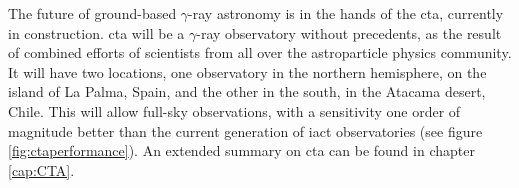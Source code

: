 \documentclass[main.tex]{subfiles}
\begin{document}
The future of ground-based $\gamma$-ray astronomy is in the hands of the \gls{cta},  currently in construction. \gls{cta} will be a $\gamma$-ray observatory without precedents, as the result of combined efforts of scientists from all over the astroparticle physics community. It will have two locations, one observatory in the northern hemisphere, on the island of La Palma, Spain, and the other in the south, in the Atacama desert, Chile. This will allow full-sky observations, with a sensitivity one order of magnitude better than the current generation of \gls{iact} observatories (see figure \ref{fig:ctaperformance}).
An extended summary on \gls{cta} can be found in chapter \ref{cap:CTA}.
\end{document}
